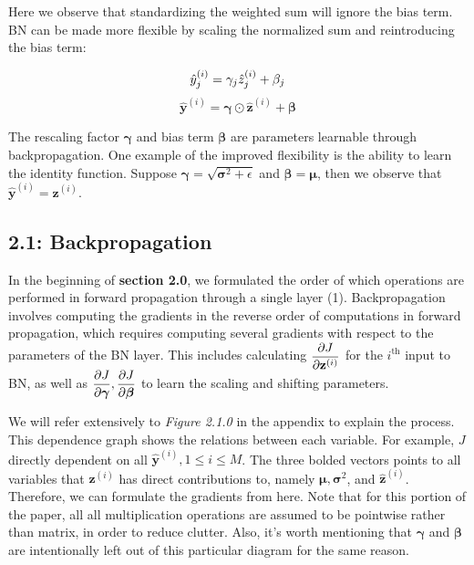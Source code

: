 \documentclass{article}
\begin{document}
\begin{multicols}{2}
Here we observe that standardizing the weighted sum will ignore the bias
term. BN can be made more flexible by scaling the normalized sum and 
reintroducing the bias term:

\begin{equation}
    \hat{y}_j^{(i)} = \gamma_j \hat{z}_j^{(i)} + \beta_j \notag
\end{equation}
\begin{equation}
    \hat{\textbf{y}}^{(i)} = \boldsymbol{\gamma} \odot \hat{\textbf{z}}^{(i)} + \boldsymbol{\beta} 
\end{equation}

The rescaling factor $\boldsymbol{\gamma}$ and bias term $\boldsymbol{\beta}$ are 
parameters learnable through backpropagation. One example of the improved
flexibility is the ability to learn the identity function. Suppose $\boldsymbol{\gamma} = \sqrt{\boldsymbol{\sigma}^2 + \epsilon}$
and $\boldsymbol{\beta} = \boldsymbol{\mu}$, then we observe that $\hat{\textbf{y}}^{(i)} = \textbf{z}^{(i)}$.







\subsection*{2.1: Backpropagation}

In the beginning of \textbf{section 2.0}, we formulated the order of which
operations are performed in forward propagation through a single layer (1). 
Backpropagation\cite{backprop} involves computing the gradients in the reverse order of 
computations in forward propagation, which
requires computing several gradients with respect to the parameters
of the BN layer. This includes calculating 
$\begin{aligned}
    {\partial J \over \partial \textbf{z}^{(i)}}
\end{aligned}$ for the $i^{\text{th}}$ input to BN, as well as $\begin{aligned}
    {\partial J \over \partial \boldsymbol{\gamma}}, {\partial J \over \partial \boldsymbol{\beta}}
\end{aligned}$ to learn the scaling and shifting parameters.

We will refer extensively to \textit{Figure 2.1.0} in the appendix 
to explain the process. This dependence graph shows the relations between 
each variable. For example, $J$ directly dependent on all $\hat{\textbf{y}}^{(i)}, 1 \leq i \leq M$.
The three bolded vectors points to all variables that $\textbf{z}^{(i)}$ has 
direct contributions to, namely $\boldsymbol{\mu}, \boldsymbol{\sigma}^2$, 
and $\hat{\textbf{z}}^{(i)}$. Therefore, we can formulate the gradients from here.
Note that for this portion of the paper, all all multiplication operations
are assumed to be pointwise rather than matrix, in order to reduce clutter.
Also, it's worth mentioning that $\boldsymbol{\gamma}$ and $\boldsymbol{\beta}$
are intentionally left out of this particular diagram for the same reason.


\end{multicols}
\end{document}
